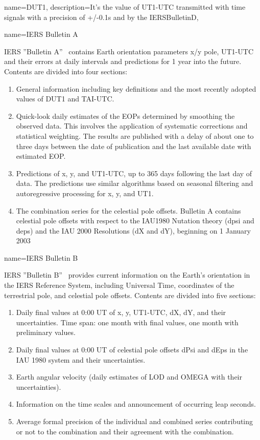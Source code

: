  {
	name={DUT1},
	description={It's the value of \gls{UT1}-\gls{UTC} transmitted with time signals with a precision of +/-0.1s and by the \gls{IERSBulletinD}},
}


	{name=IERS Bulletin A}
	{\gls{IERS} ''Bulletin A''~\cite{iersBULLETINAProductMetadata} contains Earth orientation parameters x/y pole, UT1-UTC and their errors at daily intervals and predictions for 1 year into the future. Contents are divided into four sections:
	\begin{enumerate}  
		\item General information including key definitions and the most recently adopted values of DUT1 and TAI-UTC.
		\item Quick-look daily estimates of the EOPs determined by smoothing the observed data. This involves the application of systematic corrections and statistical weighting. The results are published with a delay of about one to three days between the date of publication and the last available date with estimated EOP. 
		\item Predictions of x, y, and UT1-UTC, up to 365 days following the last day of data. The predictions use similar algorithms based on seasonal filtering and autoregressive processing for x, y, and UT1.
		\item The combination series for the celestial pole offsets. Bulletin A contains celestial pole offsets with respect to the IAU1980 Nutation theory (dpsi and deps) and the IAU 2000 Resolutions (dX and dY), beginning on 1 January 2003
	\end{enumerate}	}

{name=IERS Bulletin B}
{\gls{IERS} ''Bulletin B''~\cite{iersBULLETINBProductMetadata} provides current information on the Earth's orientation in the IERS Reference System, including Universal Time, coordinates of the terrestrial pole, and celestial pole offsets. Contents are divided into five sections:
	\begin{enumerate}  
		\item Daily final values at 0:00 UT of x, y, UT1-UTC, dX, dY, and their uncertainties. Time span: one month with final values, one month with preliminary values.
		\item Daily final values at 0:00 UT of celestial pole offsets dPsi and dEps in the IAU 1980 system and their uncertainties.
		\item Earth angular velocity (daily estimates of LOD and OMEGA with their uncertainties).
		\item Information on the time scales and announcement of occurring leap seconds.
		\item Average formal precision of the individual and combined series contributing or not to the combination and their agreement with the combination.
	\end{enumerate}	
}

